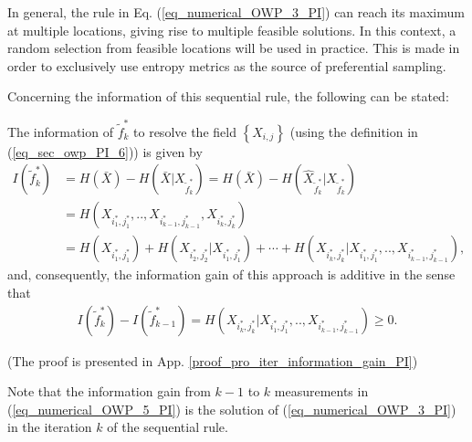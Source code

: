 {
In general, the rule in Eq. (\ref{eq_numerical_OWP_3_PI}) can reach its maximum at multiple locations, giving rise to multiple feasible solutions. In this context, a random selection from feasible locations will be used in practice. This is made in order to exclusively use entropy metrics as the source of preferential sampling.
}

{
Concerning the information of this sequential rule, the following can be stated: 
}
\begin{proposition}\label{pro_iter_information_gain_PI}
The  information of $\tilde{f}^*_k$ to resolve the field $\left\{X_{i,j} \right\}$ (using the definition in (\ref{eq_sec_owp_PI_6})) is given by 
\begin{align}\label{eq_numerical_OWP_4_PI}
	I(\tilde{f}^*_k)&= H(\bar{X}) - H(\bar{X}|{X}_{\tilde{f}^*_k})=H(\bar{X}) - H(\hat{X}_{\tilde{f}^*_k}|{X}_{\tilde{f}^*_k})\nonumber\\
			     &= H(X_{i^*_1,j^*_1},..,X_{i^*_{k-1},j^*_{k-1}},X_{i^*_k,j^*_k})\nonumber\\
			     &= H(X_{i^*_1,j^*_1}) + H(X_{i^*_2,j^*_2}|X_{i^*_1,j^*_1}) +\cdots + H(X_{i^*_k,j^*_k}|X_{i^*_1,j^*_1},..,X_{i^*_{k-1},j^*_{k-1}}),
\end{align}
and, consequently, the information gain of this %
approach is {additive} in the sense that 
\begin{align}\label{eq_numerical_OWP_5_PI}
	I(\tilde{f}^*_k)- I(\tilde{f}^*_{k-1})=  H(X_{i^*_k,j^*_k}|X_{i^*_1,j^*_1},..,X_{i^*_{k-1},j^*_{k-1}}) \geq 0. 
\end{align}
\end{proposition} (The proof is presented in App. \ref{proof_pro_iter_information_gain_PI})

\begin{remark}
Note that the information gain from $k-1$ to $k$ measurements in (\ref{eq_numerical_OWP_5_PI}) is the solution of (\ref{eq_numerical_OWP_3_PI}) in the iteration $k$ of the sequential rule.
\end{remark}


